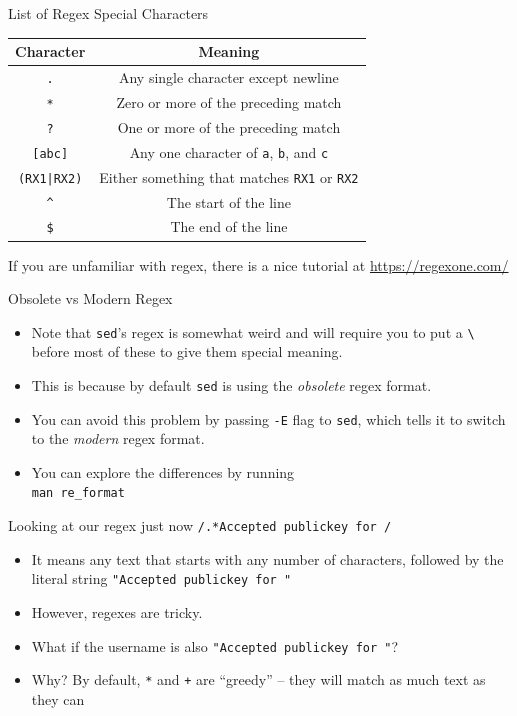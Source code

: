 \documentclass[12pt]{beamer}
\begin{document}
\begin{frame}{List of Regex Special Characters}
  \begin{tabular}{|c|c|}
    \hline
    \textbf{Character} & \textbf{Meaning}                                            \\ \hline
    \texttt{.}         & Any single character except newline                         \\ \hline
    \texttt{*}         & Zero or more of the preceding match                         \\ \hline
    \texttt{?}         & One or more of the preceding match                          \\ \hline
    \texttt{[abc]}     & Any one character of \texttt{a}, \texttt{b}, and \texttt{c} \\ \hline
    \texttt{(RX1|RX2)} & Either something that matches \texttt{RX1} or \texttt{RX2}  \\ \hline
    \texttt{\^{}}      & The start of the line                                       \\ \hline
    \texttt{\$}        & The end of the line                                         \\ \hline
  \end{tabular}

  If you are unfamiliar with regex, there is a nice tutorial at \url{https://regexone.com/}
\end{frame}

\begin{frame}{Obsolete vs Modern Regex}
  \begin{itemize}
    \item Note that \texttt{sed}'s regex is somewhat weird and will require you to put a \texttt{\textbackslash} before most of these to give them special meaning.
    \item This is because by default \texttt{sed} is using the \emph{obsolete} regex format.
    \item You can avoid this problem by passing \texttt{-E} flag to \texttt{sed}, which tells it to switch to the \emph{modern} regex format.
    \item You can explore the differences by running \\\texttt{man re_format}
  \end{itemize}
\end{frame}

\begin{frame}{Looking at our regex just now}
  \texttt{/.*Accepted publickey for /}

  \begin{itemize}
    \item It means any text that starts with any number of characters, followed by the literal string \texttt{"Accepted publickey for "}
    \item However, regexes are tricky.
    \item What if the username is also \texttt{"Accepted publickey for "}?
    \item Why? By default, \texttt{*} and \texttt{+} are ``greedy'' -- they will match as much text as they can
  \end{itemize}
\end{frame}
\end{document}
